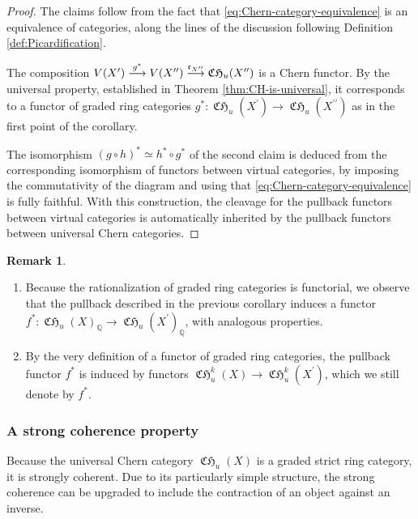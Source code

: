 \documentclass[JEP,XML,SOM,Unicode,published]{cedram}
\newcommand\To[1]{\mathchoice{\xrightarrow{\kern1pt#1\kern1pt}}{\stackrel{#1}{\longrightarrow}}{}{}}
\theoremstyle{plain}
\theoremstyle{definition}
\newtheorem{remark}[theorem]{Remark}
\newcommand{\QBbb}{\mathbb Q}
\newcommand{\cfrak}{\mathfrak c}
\newcommand{\bis}{\prime\prime}
\DeclareMathOperator{\CHfrak}{\mathfrak{CH}}
\begin{document}
\begin{proof}
The claims follow from the fact that \eqref{eq:Chern-category-equivalence} is an equivalence of categories, along the lines of the discussion following Definition \ref{def:Picardification}.

The composition $V(X^{\prime})\To{g^{\ast}} V(X^{\bis})\To{\cfrak_{X^{\bis}}}\CHfrak_{u}(X^{\bis})$ is a Chern functor. By the universal property, established in Theorem \ref{thm:CH-is-universal}, it corresponds to a functor of graded ring categories $g^\ast \colon \CHfrak_{u}(X^{\prime}) \to \CHfrak_{u}(X^{\bis})$ as in the first point of the corollary.

The isomorphism $(g\circ h)^{\ast}\simeq h^{\ast}\circ g^{\ast}$ of the second claim is deduced from the corresponding isomorphism of functors between virtual categories, by imposing the commutativity of the diagram and using that \eqref{eq:Chern-category-equivalence} is fully faithful. With this construction, the cleavage for the pullback functors between virtual categories is automatically inherited by the pullback functors between universal Chern categories.
\end{proof}

\skpt
\begin{remark}
\begin{enumerate}\label{rem:pullback-chern}
\item Because the rationalization of graded ring categories is functorial, we observe that the pullback described in the previous corollary induces a functor $f^{\ast}\colon\CHfrak_{u}(X)_{\QBbb}\to\CHfrak_{u}(X^{\prime})_{\QBbb}$, with analogous properties.
\item By the very definition of a functor of graded ring categories, the pullback functor $f^{\ast}$ is induced by functors $\CHfrak^{k}_{u}(X)\to \CHfrak_{u}^{k}(X^{\prime})$, which we still denote by $f^{\ast}$.
\end{enumerate}
\end{remark}

\subsubsection{A strong coherence property}\label{subsubsec:coherence-property}
Because the universal Chern category $\CHfrak_{u}(X)$ is a graded strict ring category, it is strongly coherent. Due to its particularly simple structure, the strong coherence can be upgraded to include the contraction of an object against an inverse.
\end{document}
